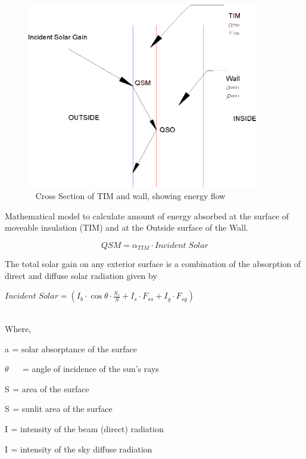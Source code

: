 \begin{figure}[hbtp] %
\centering
\includegraphics[width=0.9\textwidth, height=0.9\textheight, keepaspectratio=true]{media/image401.png}
\caption{  Cross Section of TIM and wall, showing energy flow \protect \label{fig:cross-section-of-tim-and-wall-showing-energy}}
\end{figure}

Mathematical model to calculate amount of energy absorbed at the surface of moveable insulation (TIM) and at the Outside surface of the Wall.

\begin{equation}
QSM = {\alpha_{TIM}}\cdot Incident\;Solar
\end{equation}

The total solar gain on any exterior surface is a combination of the absorption of direct and diffuse solar radiation given by

\textbf{\emph{\(Incident\;Solar = ({I_b}\cdot \cos \theta \cdot \frac{{{S_s}}}{S} + {I_s}\cdot {F_{ss}} + {I_g}\cdot {F_{sg}})\) ~~~~~~~~~~~~~~~~~~~~~~~~~~~~~~~~~~~~~~}}

Where,

a\(_{ }\) = solar absorptance of the surface

\(\theta\) ~~ = angle of incidence of the sun's rays

S\(_{ }\) = area of the surface

S\(_{ }\) = sunlit area of the surface

I\(_{ }\) = intensity of the beam (direct) radiation

I\(_{ }\) = intensity of the sky diffuse radiation

